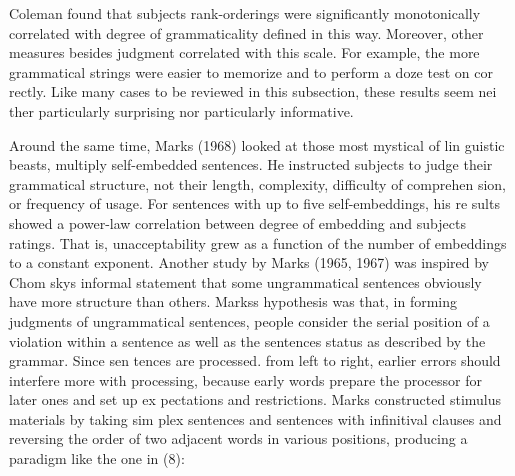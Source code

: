 \begin{styleTextbody}
Coleman found that subjects{\textquotesingle} rank-orderings were significantly monotonically correlated with degree of grammaticality defined in this way. Moreover, other measures besides judgment correlated with this scale. For example, the more grammatical strings were easier to memorize and to perform a doze test on cor\- rectly. Like many cases to be reviewed in this subsection, these results seem nei\- ther particularly surprising nor particularly informative.
\end{styleTextbody}


\begin{styleTextbody}
Around the same time, Marks (1968) looked at those most mystical of lin\- guistic beasts, multiply self-embedded sentences. He instructed subjects to judge their grammatical structure, not their length, complexity, difficulty of comprehen\- sion, or frequency of usage. For sentences with up to five self-embeddings, his re\- sults showed a power-law correlation between degree of embedding and subjects{\textquotesingle} ratings. That is, unacceptability grew as a function of the number of embeddings to a constant exponent. Another study by Marks (1965, 1967) was inspired by Chom\- sky{\textquotesingle}s informal statement that some ungrammatical sentences obviously have more structure than others. Marks{\textquotesingle}s hypothesis was that, in forming judgments of ungrammatical sentences, people consider the serial position of a violation within a sentence as well as the sentence{\textquotesingle}s status as described by the grammar. Since sen\- tences are processed. from left to right, earlier errors should interfere more with processing, because early words prepare the processor for later ones and set up ex\- pectations and restrictions. Marks constructed stimulus materials by taking sim\- plex sentences and sentences with infinitival clauses and reversing the order of two adjacent words in various positions, producing a paradigm like the one in (8):
\end{styleTextbody}


